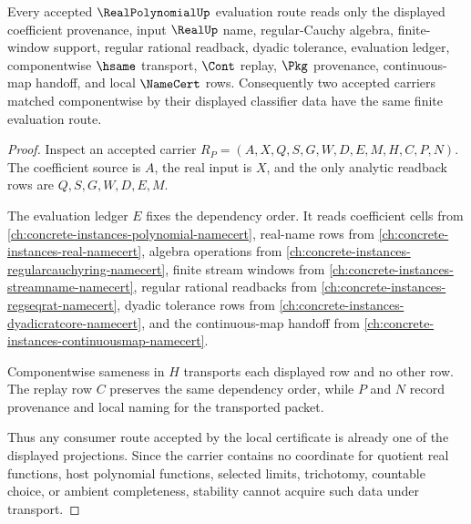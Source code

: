 \begin{theorem}
\label{thm:real-polynomial-evaluation-stability}
Every accepted $\RealPolynomialUp$ evaluation route reads only the displayed coefficient provenance, input $\RealUp$ name, regular-Cauchy algebra, finite-window support, regular rational readback, dyadic tolerance, evaluation ledger, componentwise $\hsame$ transport, $\Cont$ replay, $\Pkg$ provenance, continuous-map handoff, and local $\NameCert$ rows. Consequently two accepted carriers matched componentwise by their displayed classifier data have the same finite evaluation route.
\end{theorem}
\begin{proof}
Inspect an accepted carrier $R_P=(A,X,Q,S,G,W,D,E,M,H,C,P,N)$. The coefficient source is $A$, the real input is $X$, and the only analytic readback rows are $Q,S,G,W,D,E,M$.

The evaluation ledger $E$ fixes the dependency order. It reads coefficient cells from \autoref{ch:concrete-instances-polynomial-namecert}, real-name rows from \autoref{ch:concrete-instances-real-namecert}, algebra operations from \autoref{ch:concrete-instances-regularcauchyring-namecert}, finite stream windows from \autoref{ch:concrete-instances-streamname-namecert}, regular rational readbacks from \autoref{ch:concrete-instances-regseqrat-namecert}, dyadic tolerance rows from \autoref{ch:concrete-instances-dyadicratcore-namecert}, and the continuous-map handoff from \autoref{ch:concrete-instances-continuousmap-namecert}.

Componentwise sameness in $H$ transports each displayed row and no other row. The replay row $C$ preserves the same dependency order, while $P$ and $N$ record provenance and local naming for the transported packet.

Thus any consumer route accepted by the local certificate is already one of the displayed projections. Since the carrier contains no coordinate for quotient real functions, host polynomial functions, selected limits, trichotomy, countable choice, or ambient completeness, stability cannot acquire such data under transport.
\end{proof}

